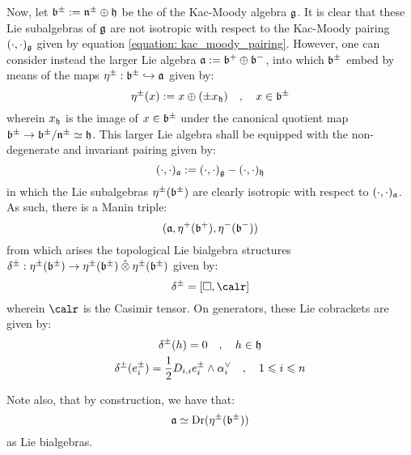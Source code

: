         Now, let $\mathfrak{b}^{\pm} := \mathfrak{n}^{\pm} \oplus \mathfrak{h}$ be the  of the Kac-Moody algebra $\mathfrak{g}$. It is clear that these Lie subalgebras of $\mathfrak{g}$ are not isotropic with respect to the Kac-Moody pairing $(\cdot, \cdot)_{\mathfrak{g}}$ given by equation \eqref{equation: kac_moody_pairing}. However, one can consider instead the larger Lie algebra $\mathfrak{a} := \mathfrak{b}^+ \oplus \mathfrak{b}^-$, into which $\mathfrak{b}^{\pm}$ embed by means of the maps $\eta^{\pm}: \mathfrak{b}^{\pm} \hookrightarrow \mathfrak{a}$ given by:
            \begin{equation} \label{equation: borel_lie_sub_bialgebra_embeddings}
                \eta^{\pm}(x) := x \oplus ( \pm x_{\mathfrak{h}} ) \quad, \quad x \in \mathfrak{b}^{\pm}
            \end{equation}
        wherein $x_{\mathfrak{h}}$ is the image of $x \in \mathfrak{b}^{\pm}$ under the canonical quotient map $\mathfrak{b}^{\pm} \to \mathfrak{b}^{\pm}/\mathfrak{n}^{\pm} \simeq \mathfrak{h}$. This larger Lie algebra shall be equipped with the non-degenerate and invariant pairing given by:
            $$(\cdot, \cdot)_{\mathfrak{a}} := (\cdot, \cdot)_{\mathfrak{g}} - (\cdot, \cdot)_{\mathfrak{h}}$$
        in which the Lie subalgebras $\eta^{\pm}(\mathfrak{b}^{\pm})$ are clearly isotropic with respect to $(\cdot, \cdot)_{\mathfrak{a}}$. As such, there is a Manin triple:
            $$(\mathfrak{a}, \eta^+(\mathfrak{b}^+), \eta^-(\mathfrak{b}^-))$$
        from which arises the topological Lie bialgebra structures $\delta^{\pm}: \eta^{\pm}(\b^{\pm}) \to \eta^{\pm}(\b^{\pm}) \hattensor \eta^{\pm}(\b^{\pm})$ given by:
            $$\delta^{\pm} = [\Box, \calr]$$
        wherein $\calr$ is the Casimir tensor. On generators, these Lie cobrackets are given by:
            \begin{equation} \label{equation: standard_kac_moody_lie_bialgebra_structure}
                \begin{gathered}
                    \delta^{\pm}(h) = 0 \quad, \quad h \in \mathfrak{h}
                    \\
                    \delta^{\pm}(e_i^{\pm}) = \frac12 D_{i, i} e_i^{\pm} \wedge \alpha_i^{\vee} \quad, \quad 1 \leqslant i \leqslant n
                \end{gathered}
            \end{equation}
        \begin{remark}
            Note also, that by construction, we have that:
                $$\mathfrak{a} \simeq \operatorname{Dr}( \eta^{\pm}( \mathfrak{b}^{\pm} ) )$$
            as Lie bialgebras.
        \end{remark}
            

